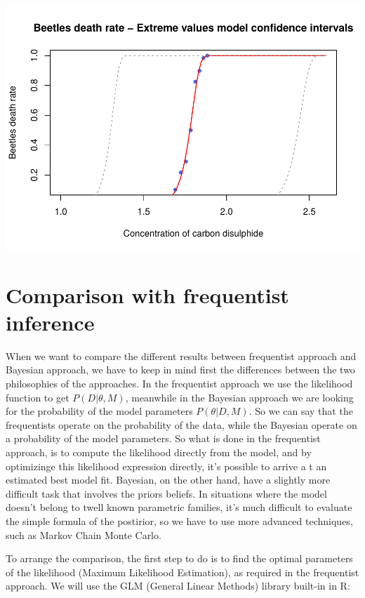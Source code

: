 \documentclass[]{article}
\begin{document}
\includegraphics{FinalProject-SDSII_files/figure-latex/unnamed-chunk-29-1.pdf}

\hypertarget{comparison-with-frequentist-inference}{%
\section{Comparison with frequentist
inference}\label{comparison-with-frequentist-inference}}

When we want to compare the different results between frequentist
approach and Bayesian approach, we have to keep in mind first the
differences between the two philosophies of the approaches. In the
frequentist approach we use the likelihood function to get
\(P(D| \theta, M)\), meanwhile in the Bayesian approach we are looking
for the probability of the model parameters \(P(\theta| D, M)\). So we
can say that the frequentists operate on the probability of the data,
while the Bayesian operate on a probability of the model parameters. So
what is done in the frequentist approach, is to compute the likelihood
directly from the model, and by optimizinge this likelihood expression
directly, it's possible to arrive a t an estimated best model fit.
Bayesian, on the other hand, have a slightly more difficult task that
involves the priors beliefs. In situations where the model doesn't
belong to twell known parametric families, it's much difficult to
evaluate the simple formula of the postirior, so we have to use more
advanced techniques, such as Markov Chain Monte Carlo.

To arrange the comparison, the first step to do is to find the optimal
parameters of the likelihood (Maximum Likelihood Estimation), as
required in the frequentist approach. We will use the GLM (General
Linear Methods) library built-in in R:
\end{document}

